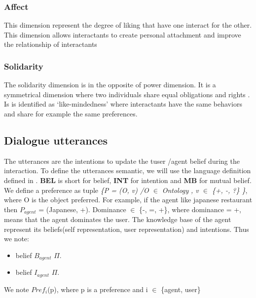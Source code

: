 \documentclass{llncs}
\begin{document}
\subsubsection{Affect}
This dimension represent the degree of liking that have one interact for the other. This dimension allows interactants to create personal attachment and improve the relationship of interactants \cite{nicholson2001role}
\subsubsection{Solidarity}
The solidarity dimension is in the opposite of power dimension. It is a symmetrical dimension where two individuals share equal obligations and rights \cite{svennevig2000getting}. Is is identified as ‘like-mindedness’ \cite{bickmore2005establishing} where interactants have the same behaviors and share for example the same preferences.
\subsection{Dialogue utterances}
The utterances are the intentions to update the tuser /agent belief during the interaction. 
To define the utterances semantic, we will use the language definition defined in \cite{sidner}. \textbf{BEL} is short for belief, \textbf{INT} for intention and \textbf{MB} for mutual belief.
We define a preference as tuple \emph{\{P = (O, v) /O $\in$} \textit{Ontology} \emph{, v $\in$ \{+, -, ?\} \}}, where O is the object preferred. For example, if the agent like japanese restaurant then $P_{agent}$ = (Japanese, +). 
Dominance $\in$ \{-, =, +\}, where dominance = +, means that the agent dominates the user. The knowledge base of the agent represent its beliefs(self representation, user representation) and intentions. Thus we note:
\begin{itemize}
\item belief $B_{agent}$ $\Pi$.
\item belief $I_{agent}$ $\Pi$.
\end{itemize} 
We note $Pref_{i}$(p), where p is a preference and i $\in$ \{agent, user\}
\end{document}
